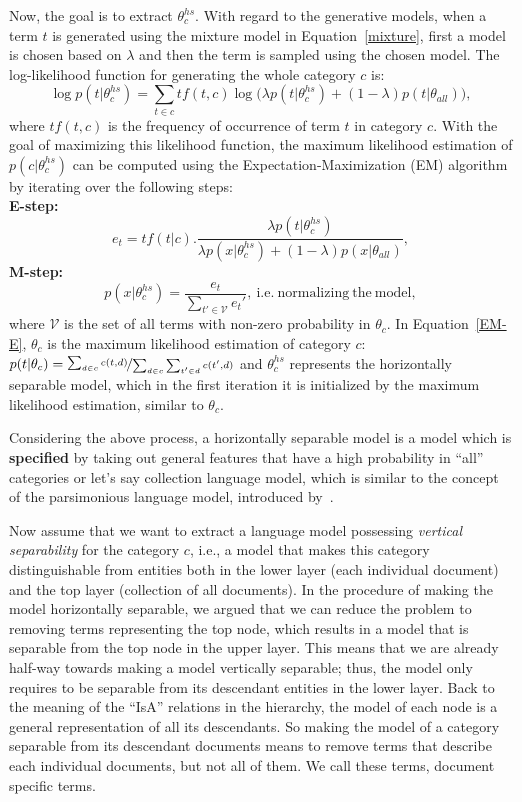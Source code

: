 Now, the goal is to extract $\theta_{c}^{hs}$. With regard to the generative models, when a term $t$ is generated using the mixture model in Equation~\ref{mixture}, first a model is chosen based on $\lambda$ and then the term is sampled using the chosen model.  The log-likelihood function for generating the whole category $c$ is:
\begin{equation}
\log p(t|\theta_{c}^{hs}) = \sum_{t \in c} tf(t,c) \log \big(\lambda p(t|\theta_{c}^{hs}) + (1-\lambda) p(t|\theta_{all})\big),
\end{equation}
where $tf(t,c)$ is the frequency of occurrence of term $t$ in category $c$. 
With the goal of maximizing this likelihood function, the maximum likelihood estimation of $p(c|\theta_{c}^{hs})$ can be computed using the Expectation-Maximization (EM) algorithm by iterating over the following steps:
\\
\textbf{E-step:}
\begin{equation}
e_t = tf(t|c).\frac{\lambda p(t|\theta_{c}^{hs})}{\lambda p(x|\theta_{c}^{hs}) + (1-\lambda) p(x|\theta_{all})}
\label{EM-E},
\end{equation}
\textbf{M-step:}
\begin{equation}
p(x|\theta_{c}^{hs}) = \frac{e_t}{\sum_{t' \in \mathcal{V}} e_t'}, \mathrm{~i.e.~normalizing~the~model},
\label{EM-M}
\end{equation}
where $\mathcal{V}$ is the set of all terms with non-zero probability in $\theta_c$. In Equation~\ref{EM-E}, $\theta_c$ is the maximum likelihood estimation of category $c$: $p(t|\theta_{c}) = \nicefrac{\sum_{d \in c}c(t,d)}{\sum_{d \in c}{\sum_{t' \in d} c(t',d)}}$ and $\theta_{c}^{hs}$ represents the horizontally separable model, which in the first iteration it is initialized by the maximum likelihood estimation, similar to $\theta_c$. 

Considering the above process, a horizontally separable model is a model which is \textbf{specified} by taking out general features that have a high probability in ``all'' categories or let's say collection language model, which is similar to the concept of the parsimonious language model, introduced by~\citet{Hiemstra:2004}.

Now assume that we want to extract a language model possessing \emph{vertical separability} for the category $c$, i.e., a model that makes this category distinguishable from entities both in the lower layer (each individual document) and the top layer (collection of all documents).
%
In the procedure of making the model horizontally separable, we argued that we can reduce the problem to removing terms representing the top node, which results in a model that is separable from the top node in the upper layer. This means that we are already half-way towards making a model vertically separable; thus, the model only requires to be separable from its descendant entities in the lower layer.  
Back to the meaning of the ``IsA'' relations in the hierarchy, the model of each node is a general representation of all its descendants. So making the model of a category separable from its descendant documents means to remove terms that describe each individual documents, but not all of them. We call these terms, document specific terms.

